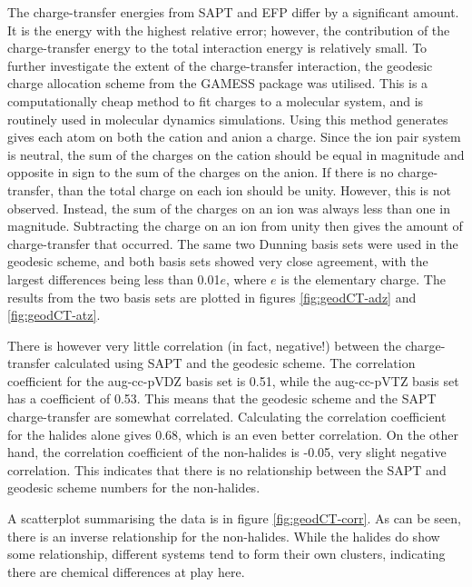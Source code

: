 \documentclass[final]{article}
\begin{document}
\begin{multicols}{2}
The charge-transfer energies from SAPT and EFP differ by a significant amount. 
It is the energy with the highest relative error; however, the contribution of the charge-transfer energy to the total interaction energy is relatively small.
To further investigate the extent of the charge-transfer interaction, the geodesic charge allocation scheme from the GAMESS package was utilised.
This is a computationally cheap method to fit charges to a molecular system, and is routinely used in molecular dynamics simulations.
Using this method generates gives each atom on both the cation and anion a charge. 
Since the ion pair system is neutral, the sum of the charges on the cation should be equal in magnitude and opposite in sign to the sum of the charges on the anion.
If there is no charge-transfer, than the total charge on each ion should be unity. 
However, this is not observed. 
Instead, the sum of the charges on an ion was always less than one in magnitude. 
Subtracting the charge on an ion from unity then gives the amount of charge-transfer that occurred. 
The same two Dunning basis sets were used in the geodesic scheme, and both basis sets showed very close agreement, with the largest differences being less than 0.01$e$, where $e$ is the elementary charge. 
The results from the two basis sets are plotted in 
figures \ref{fig:geodCT-adz} and \ref{fig:geodCT-atz}.


There is however very little correlation (in fact, negative!) between the charge-transfer calculated using SAPT and the geodesic scheme. 
The correlation coefficient for the aug-cc-pVDZ basis set is 0.51, while the aug-cc-pVTZ basis set has a coefficient of 0.53. %
This means that the geodesic scheme and the SAPT charge-transfer are somewhat correlated. 
Calculating the correlation coefficient for the halides alone gives 0.68, which is an even better correlation.
On the other hand, the correlation coefficient of the non-halides is -0.05, very slight negative correlation. 
This indicates that there is no relationship between the SAPT and geodesic scheme numbers for the non-halides.



A scatterplot summarising the data is in figure \ref{fig:geodCT-corr}. 
As can be seen, there is an inverse relationship for the non-halides.
While the halides do show some relationship, different systems tend to form their own clusters, indicating there are chemical differences at play here.



\end{multicols}
\end{document}
